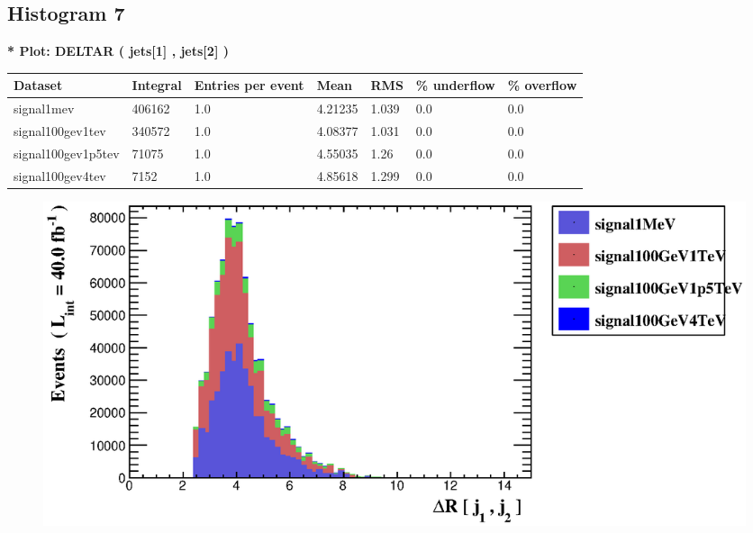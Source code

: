 \documentclass[a4paper, 10pt]{article}
\begin{document}
\subsection{ Histogram 7}

\textbf{* Plot: DELTAR ( jets[1] , jets[2] ) }\\
   \begin{table}[H]
  \begin{center}
    \begin{tabular}{|m{23.0mm}|m{23.0mm}|m{18.0mm}|m{19.0mm}|m{19.0mm}|m{19.0mm}|m{19.0mm}|}
      \hline
      {\cellcolor{yellow}         Dataset}& {\cellcolor{yellow}         Integral}& {\cellcolor{yellow}         Entries per event}& {\cellcolor{yellow}         Mean}& {\cellcolor{yellow}         RMS}& {\cellcolor{yellow}         \% underflow}& {\cellcolor{yellow}         \% overflow}\\
      \hline
      {\cellcolor{white}         signal1mev}& {\cellcolor{white}         406162}& {\cellcolor{white}         1.0}& {\cellcolor{white}         4.21235}& {\cellcolor{white}         1.039}& {\cellcolor{green}         0.0}& {\cellcolor{green}         0.0}\\
      \hline
      {\cellcolor{white}         signal100gev1tev}& {\cellcolor{white}         340572}& {\cellcolor{white}         1.0}& {\cellcolor{white}         4.08377}& {\cellcolor{white}         1.031}& {\cellcolor{green}         0.0}& {\cellcolor{green}         0.0}\\
      \hline
      {\cellcolor{white}         signal100gev1p5tev}& {\cellcolor{white}         71075}& {\cellcolor{white}         1.0}& {\cellcolor{white}         4.55035}& {\cellcolor{white}         1.26}& {\cellcolor{green}         0.0}& {\cellcolor{green}         0.0}\\
      \hline
      {\cellcolor{white}         signal100gev4tev}& {\cellcolor{white}         7152}& {\cellcolor{white}         1.0}& {\cellcolor{white}         4.85618}& {\cellcolor{white}         1.299}& {\cellcolor{green}         0.0}& {\cellcolor{green}         0.0}\\
\hline
    \end{tabular}
  \end{center}
\end{table}

\begin{figure}[H]
  \begin{center}
    \includegraphics[scale=0.45]{selection_6.eps}\\
\caption{   }
  \end{center}
\end{figure}
      \newpage
\end{document}
